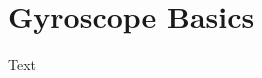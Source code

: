 


\renewcommand{\currentpart}{LASA Robotics Technical Documentation for RobotC}
\renewcommand{\currentchapter}{Using the HiTechnic Gyroscope}

\section{Gyroscope Basics}
{Text}




